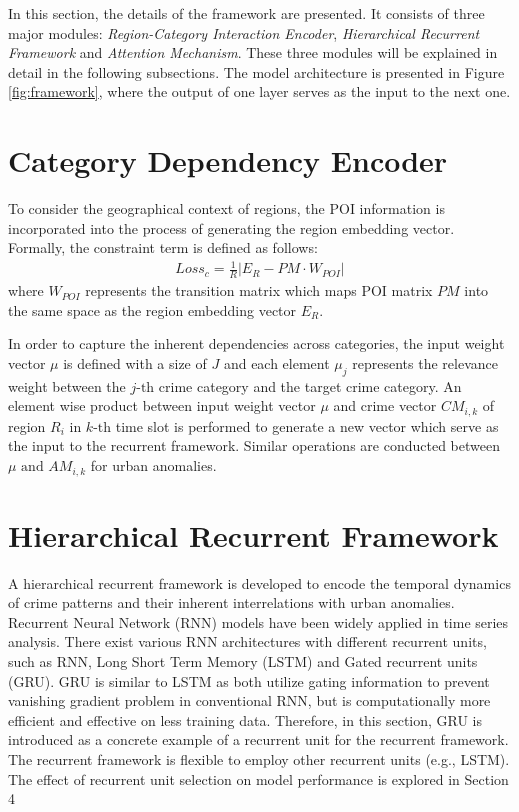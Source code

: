 In this section, the details of the framework are presented. It consists of three major modules: \emph{Region-Category Interaction Encoder}, \emph{Hierarchical Recurrent Framework} and \emph{Attention Mechanism}. These three modules will be explained in detail in the following subsections. The model architecture is presented in Figure \ref{fig:framework}, where the output of one layer serves as the input to the next one.

\section{Category Dependency Encoder}
To consider the geographical context of regions, the POI information is incorporated into the process of generating the region
embedding vector. Formally, the constraint term is defined as follows:
\begin{equation}
    \begin{gathered}
        Loss_c = \frac{1}{R}| E_R - PM \cdot W_{POI} | \label{1}
    \end{gathered}
\end{equation}
where $W_{POI}$ represents the transition matrix which maps POI matrix $PM$ into the same space as the region embedding vector $E_R$.

In order to capture the inherent dependencies across categories,
the input weight vector $\mu$ is defined with a size of $J$ and each element $\mu_j$ represents the relevance weight between the $j\text{-th}$ crime
category and the target crime category. An element wise
product between input weight vector $\mu$ and crime vector $CM_{i,k}$ of region $R_i$ in $k\text{-th}$ time slot is performed to generate a new vector which serve as the input to the recurrent framework. Similar operations are
conducted between $\mu \text{ and } AM_{i,k}$ for urban anomalies.

\section{Hierarchical Recurrent Framework}

A hierarchical recurrent framework is developed to encode the temporal dynamics of crime patterns and their inherent interrelations with urban anomalies. Recurrent Neural Network (RNN) models have been widely applied in time series analysis. There exist various RNN architectures with different recurrent units, such as RNN, Long Short Term Memory (LSTM) and Gated recurrent units
(GRU). GRU is similar to LSTM as both utilize gating information to prevent vanishing gradient problem in conventional RNN, but is computationally more efficient and effective on less training data. Therefore, in this section, GRU is introduced as a concrete example of a recurrent unit for the recurrent framework. The recurrent framework is flexible to employ other recurrent units (e.g., LSTM). The effect of recurrent unit selection on model performance
is explored in Section 4

